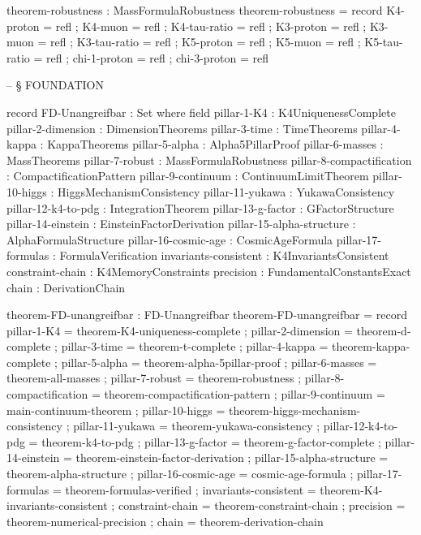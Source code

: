 \documentclass[11pt,a4paper]{book}
\begin{document}
\begin{code}
theorem-robustness : MassFormulaRobustness
theorem-robustness = record
  { K4-proton     = refl
  ; K4-muon       = refl
  ; K4-tau-ratio  = refl
  ; K3-proton     = refl
  ; K3-muon       = refl
  ; K3-tau-ratio  = refl
  ; K5-proton     = refl
  ; K5-muon       = refl
  ; K5-tau-ratio  = refl
  ; chi-1-proton  = refl
  ; chi-3-proton  = refl
  }


-- § FOUNDATION

record FD-Unangreifbar : Set where
  field
    pillar-1-K4       : K4UniquenessComplete
    pillar-2-dimension : DimensionTheorems
    pillar-3-time     : TimeTheorems
    pillar-4-kappa    : KappaTheorems
    pillar-5-alpha    : Alpha5PillarProof
    pillar-6-masses   : MassTheorems
    pillar-7-robust   : MassFormulaRobustness
    pillar-8-compactification : CompactificationPattern
    pillar-9-continuum : ContinuumLimitTheorem
    pillar-10-higgs : HiggsMechanismConsistency
    pillar-11-yukawa : YukawaConsistency
    pillar-12-k4-to-pdg : IntegrationTheorem
    pillar-13-g-factor : GFactorStructure
    pillar-14-einstein : EinsteinFactorDerivation
    pillar-15-alpha-structure : AlphaFormulaStructure
    pillar-16-cosmic-age : CosmicAgeFormula
    pillar-17-formulas : FormulaVerification
    invariants-consistent : K4InvariantsConsistent
    constraint-chain  : K4MemoryConstraints
    precision         : FundamentalConstantsExact
    chain             : DerivationChain

theorem-FD-unangreifbar : FD-Unangreifbar
theorem-FD-unangreifbar = record
  { pillar-1-K4          = theorem-K4-uniqueness-complete
  ; pillar-2-dimension   = theorem-d-complete
  ; pillar-3-time        = theorem-t-complete
  ; pillar-4-kappa       = theorem-kappa-complete
  ; pillar-5-alpha       = theorem-alpha-5pillar-proof
  ; pillar-6-masses      = theorem-all-masses
  ; pillar-7-robust      = theorem-robustness
  ; pillar-8-compactification = theorem-compactification-pattern
  ; pillar-9-continuum   = main-continuum-theorem
  ; pillar-10-higgs      = theorem-higgs-mechanism-consistency
  ; pillar-11-yukawa     = theorem-yukawa-consistency
  ; pillar-12-k4-to-pdg  = theorem-k4-to-pdg
  ; pillar-13-g-factor   = theorem-g-factor-complete
  ; pillar-14-einstein   = theorem-einstein-factor-derivation
  ; pillar-15-alpha-structure = theorem-alpha-structure
  ; pillar-16-cosmic-age = cosmic-age-formula
  ; pillar-17-formulas   = theorem-formulas-verified
  ; invariants-consistent = theorem-K4-invariants-consistent
  ; constraint-chain     = theorem-constraint-chain
  ; precision            = theorem-numerical-precision
  ; chain                = theorem-derivation-chain
  }


\end{code}
\end{document}
